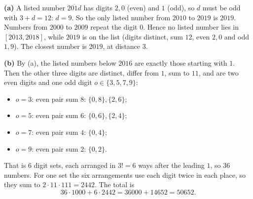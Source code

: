 \textbf{(a)} A listed number $\overline{201d}$ has digits $2,0$ (even) and $1$ (odd), so $d$ must be odd with $3+d=12$: $d=9$. So the only listed number from $2010$ to $2019$ is $2019$. Numbers from $2000$ to $2009$ repeat the digit $0$. Hence no listed number lies in $[2013,2018]$, while $2019$ is on the list (digits distinct, sum $12$, even $2,0$ and odd $1,9$). The closest number is $\boxed{2019}$, at distance $3$.

\textbf{(b)} By (a), the listed numbers below $2016$ are exactly those starting with $1$. Then the other three digits are distinct, differ from $1$, sum to $11$, and are two even digits and one odd digit $o\in\{3,5,7,9\}$:
\begin{itemize}
\item $o=3$: even pair sum $8$: $\{0,8\},\{2,6\}$;
\item $o=5$: even pair sum $6$: $\{0,6\},\{2,4\}$;
\item $o=7$: even pair sum $4$: $\{0,4\}$;
\item $o=9$: even pair sum $2$: $\{0,2\}$.
\end{itemize}
That is $6$ digit sets, each arranged in $3!=6$ ways after the leading $1$, so $36$ numbers. For one set the six arrangements use each digit twice in each place, so they sum to $2\cdot11\cdot111=2442$. The total is
\[
36\cdot1000+6\cdot2442=36000+14652=\boxed{50652}.
\]
